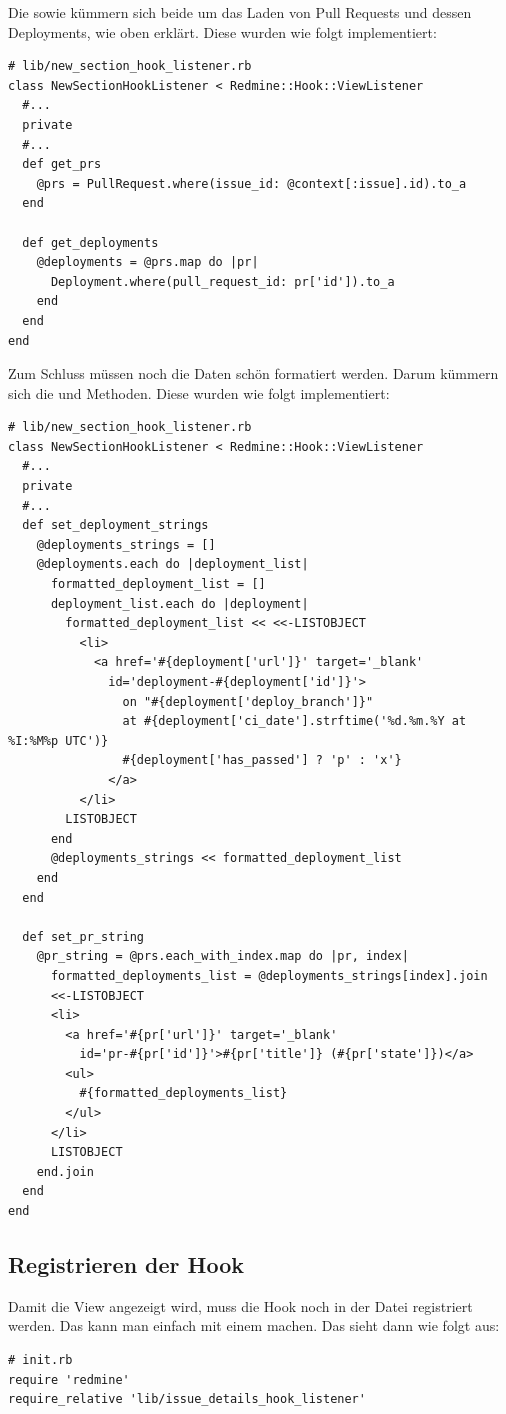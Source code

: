 Die  sowie  kümmern sich beide um das Laden
von Pull Requests und dessen Deployments, wie oben erklärt. Diese wurden wie folgt implementiert:
\begin{codebox}[]
  \begin{verbatim}
# lib/new_section_hook_listener.rb
class NewSectionHookListener < Redmine::Hook::ViewListener
  #...
  private
  #...
  def get_prs
    @prs = PullRequest.where(issue_id: @context[:issue].id).to_a
  end

  def get_deployments
    @deployments = @prs.map do |pr|
      Deployment.where(pull_request_id: pr['id']).to_a
    end
  end
end
  \end{verbatim}
\end{codebox}
Zum Schluss müssen noch die Daten schön formatiert werden. Darum kümmern sich die \newline
{} und  Methoden. Diese wurden
wie folgt implementiert:
\begin{codebox}[]
  \begin{verbatim}
# lib/new_section_hook_listener.rb
class NewSectionHookListener < Redmine::Hook::ViewListener
  #...
  private
  #...
  def set_deployment_strings
    @deployments_strings = []
    @deployments.each do |deployment_list|
      formatted_deployment_list = []
      deployment_list.each do |deployment|
        formatted_deployment_list << <<-LISTOBJECT
          <li>
            <a href='#{deployment['url']}' target='_blank'
              id='deployment-#{deployment['id']}'>
                on "#{deployment['deploy_branch']}"
                at #{deployment['ci_date'].strftime('%d.%m.%Y at %I:%M%p UTC')}
                #{deployment['has_passed'] ? 'p' : 'x'} 
              </a>
          </li>
        LISTOBJECT
      end
      @deployments_strings << formatted_deployment_list
    end
  end

  def set_pr_string
    @pr_string = @prs.each_with_index.map do |pr, index|
      formatted_deployments_list = @deployments_strings[index].join
      <<-LISTOBJECT
      <li>
        <a href='#{pr['url']}' target='_blank'
          id='pr-#{pr['id']}'>#{pr['title']} (#{pr['state']})</a>
        <ul>
          #{formatted_deployments_list}
        </ul>  
      </li>
      LISTOBJECT
    end.join
  end
end
  \end{verbatim}
\end{codebox}
\subsection{Registrieren der Hook}
Damit die View angezeigt wird, muss die Hook noch in der  Datei registriert werden. Das
kann man einfach mit einem  machen. Das  sieht dann wie folgt aus:
\begin{codebox}[]
  \begin{verbatim}
# init.rb
require 'redmine'
require_relative 'lib/issue_details_hook_listener'
  \end{verbatim}
\end{codebox}
